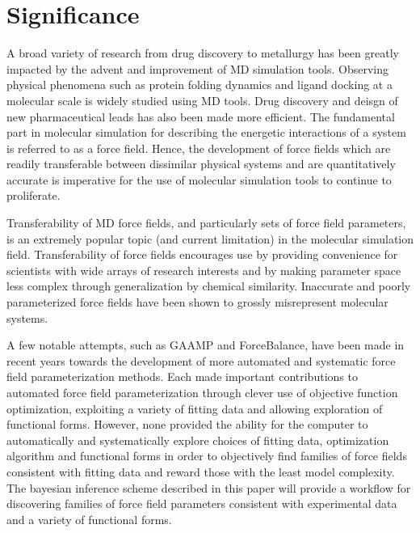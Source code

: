 \documentclass[rmp,nofootinbib,superscriptaddress,12pt,tightenlines,notitlepage]{revtex4-1}
\begin{document}
\section{Significance}
A broad variety of research from drug discovery to metallurgy has been greatly impacted by the advent and 
improvement of MD simulation tools. Observing physical phenomena such as protein folding dynamics and ligand 
docking at a molecular scale is widely studied using MD tools.\cite{villin,villin2} Drug discovery and deisgn 
of new pharmaceutical leads has also been made more efficient.\cite{drug_discov} The fundamental part in molecular 
simulation for describing the energetic interactions of a system is referred to as a force field. Hence, 
the development of force fields which are readily transferable between dissimilar physical systems and are 
quantitatively accurate is imperative for the use of molecular simulation tools to continue to proliferate.

Transferability of MD force fields, and particularly sets of force field parameters, is an extremely popular 
topic (and current limitation) in the molecular simulation field.\cite{transferability1,transferability2,
transferability3,transferability4} Transferability of force fields encourages use by providing convenience 
for scientists with wide arrays of research interests and by making parameter space less complex through 
generalization by chemical similarity. Inaccurate and poorly parameterized force fields have been shown to 
grossly misrepresent molecular systems.\cite{ffcomp1,ffcomp2,robustness} 

A few notable attempts, such as GAAMP and ForceBalance, have been made in recent years towards the development of more automated and systematic 
force field parameterization methods.\cite{GAAMP,FB1,FB2,FB3} Each made important contributions to automated 
force field parameterization through clever use of objective function optimization, exploiting a variety of 
fitting data and allowing exploration of functional forms. However, none provided the ability for the computer 
to automatically and systematically explore choices of fitting data, optimization algorithm and functional 
forms in order to objectively find families of force fields consistent with fitting data and reward those with 
the least model complexity. The bayesian inference scheme described in this paper will provide a workflow for 
discovering families of force field parameters consistent with experimental data and a variety of functional forms.
\end{document}
